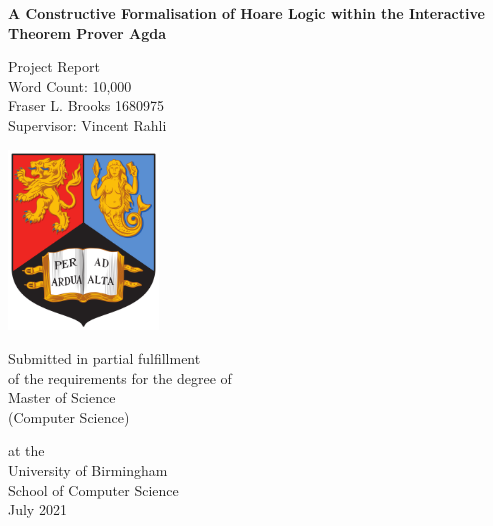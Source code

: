 \documentclass[oneside,12pt]{article}
\begin{document}
\begin{titlepage}
  \begin{center}
    \large

    \textbf{\Large A Constructive Formalisation of Hoare Logic within the Interactive Theorem Prover Agda}

    
    \vfill

    Project Report \\
    Word Count: 10,000  \\
    Fraser L. Brooks 1680975 \\
    Supervisor: Vincent Rahli
    
    \vfill
    \includegraphics[width=4cm]{Figures/birmingham_shield.png}
    \vfill
       
    Submitted in partial fulfillment \\
    of the requirements for the degree of\\
    Master of Science \\
    (Computer Science) \\
       
    \vfill
       
    at the \\
    University of Birmingham\\
    School of Computer Science\\
    July 2021
       
    \vspace{0.8cm}
       
  \end{center}
\end{titlepage}

\flushbottom
\end{document}
